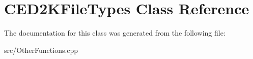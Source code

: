 \section{CED2KFileTypes Class Reference}
\label{classCED2KFileTypes}


The documentation for this class was generated from the following file:\begin{DoxyCompactItemize}
\item 
src/OtherFunctions.cpp\end{DoxyCompactItemize}
